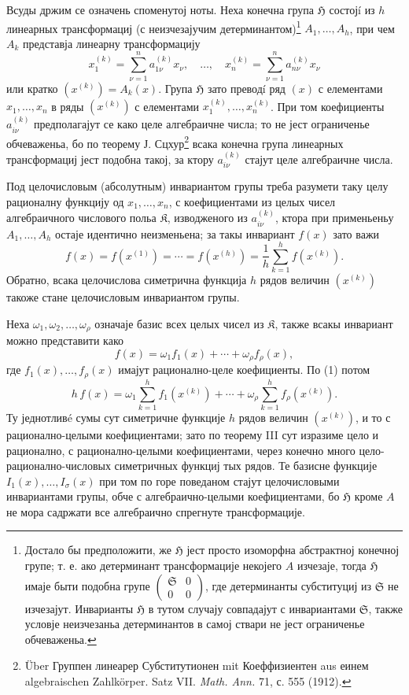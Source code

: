 ﻿\documentclass[11pt]{article}
\providecommand{\frH}{\mathfrak H}
\providecommand{\frK}{\mathfrak K}
\providecommand{\frS}{\mathfrak S}
\begin{document}
Всуды држим се означень споменутој ноты. Неха конечна група \(\frH\) состојí из \(h\) линеарных трансформациј (с неизчезајучим детерминантом)\footnote{Достало бы предположити, же \(\frH\) јест просто изоморфна абстрактној конечној групе; т. е. ако детерминант трансформације некојего \(A\) изчезаје, тогда \(\frH\) имаје быти подобна групе \(\begin{pmatrix}\frS&0\\0&0\end{pmatrix}\), где детерминанты субституциј из \(\frS\) не изчезајут. Инварианты \(\frH\) в тутом случају совпадајут с инвариантами \(\frS\), также условје неизчезаньа детерминантов в самој ствари не јест ограниченье обчеваженьа.} \(A_1,\ldots,A_h\), при чем \(A_k\) представја линеарну трансформацију
\[
        x_1^{(k)}=\sum_{\nu=1}^{n}a_{1\nu}^{(k)}x_\nu,
        \quad\ldots,\quad
        x_n^{(k)}=\sum_{\nu=1}^{n}a_{n\nu}^{(k)}x_\nu
\]
или кратко \((x^{(k)})=A_k(x)\). Група \(\frH\) зато преводí ряд \((x)\) с елементами \(x_1,\ldots,x_n\) в ряды \((x^{(k)})\) с елементами \(x_1^{(k)},\ldots,x_n^{(k)}\). При том коефициенты \(a_{i\nu}^{(k)}\) предполагајут се како целе алгебраичне числа; то не јест ограниченье обчеваженьа, бо по теорему Ј. Сцхур\footnote{Über Группен линеарер Субститутионен mit Коеффизиентен aus еинем algebraischen Zahlkörper. Satz VII. \emph{Math. Ann.} 71, с. 555 (1912).} всака конечна група линеарных трансформациј јест подобна такој, за ктору \(a_{i\nu}^{(k)}\) стајут целе алгебраичне числа.

Под целочисловым (абсолутным) инвариантом групы треба разумети таку целу рационалну функцију од \(x_1,\ldots,x_n\), с коефициентами из целых чисел алгебраичного числового польа \(\frK\), изводженого из \(a_{i\nu}^{(k)}\), ктора при применьеньу \(A_1,\ldots,A_h\) остаје идентично неизменьена; за такы инвариант \(f(x)\) зато важи
\begin{equation}
        f(x)=f(x^{(1)})=\cdots=f(x^{(h)})
        =\frac1h\sum_{k=1}^{h}f(x^{(k)}).
\end{equation}
Обратно, всака целочислова симетрична функција \(h\) рядов величин \((x^{(k)})\) такоже стане целочисловым инвариантом групы.

Неха \(\omega_1,\omega_2,\ldots,\omega_\rho\) означаје базис всех целых чисел из \(\frK\), также всакы инвариант можно представити како
\[
        f(x)=\omega_1 f_1(x)+\cdots+\omega_\rho f_\rho(x),
\]
где \(f_1(x),\ldots,f_\rho(x)\) имајут рационално-целе коефициенты. По (1) потом
\[
        h\,f(x)
        =
        \omega_1\sum_{k=1}^{h}f_1(x^{(k)})
        +\cdots+
        \omega_\rho\sum_{k=1}^{h}f_\rho(x^{(k)}).
\]
Ту једнотливé сумы сут симетричне функције \(h\) рядов величин \((x^{(k)})\), и то с рационално-целыми коефициентами; зато по теорему III сут изразиме цело и рационално, с рационално-целыми коефициентами, через конечно много цело-рационално-числовых симетричных функциј тых рядов. Те базисне функције \(I_1(x),\ldots,I_\sigma(x)\) при том по горе поведаном стајут целочисловыми инвариантами групы, обче с алгебраично-целыми коефициентами, бо \(\frH\) кроме \(A\) не мора садржати все алгебраично спрегнуте трансформације.
\end{document}
